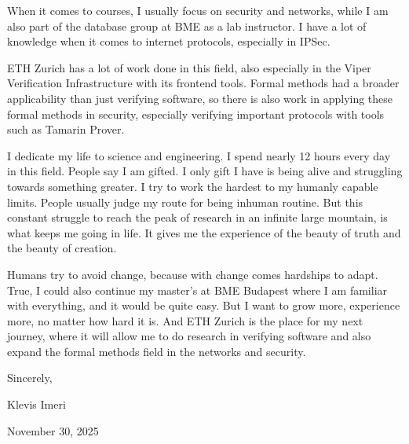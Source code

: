 \documentclass{article}
\newcommand{\LetterDate}{November 30, 2025}
\begin{document}
When it comes to courses, I usually focus on security and networks, while I am
also part of the database group at BME as a lab instructor. I have a lot of
knowledge when it comes to internet protocols, especially in IPSec.

ETH Zurich has a lot of work done in this field, also especially in the Viper
Verification Infrastructure with its frontend tools. Formal methods had a
broader applicability than just verifying software, so there is also work in
applying these formal methods in security, especially verifying important
protocols with tools such as Tamarin Prover.

I dedicate my life to science and engineering. I spend nearly 12 hours every day
in this field. People say I am gifted. I only gift I have is being alive and
struggling towards something greater. I try to work the hardest to my humanly
capable limits. People usually judge my route for being inhuman routine. But this
constant struggle to reach the peak of research in an infinite large mountain, is what keeps me
going in life. It gives me the experience of the beauty of truth and the beauty
of creation.

Humans try to avoid change, because with change comes hardships to
adapt. True, I could also continue my master's at BME Budapest where I am familiar
with everything, and it would be quite easy. But I want to grow more, experience
more, no matter how hard it is. And ETH Zurich is the place for my next journey,
where it will allow me to do research in verifying software and also
expand the formal methods field in the networks and security.

\vspace{1cm} %

\noindent
\begin{minipage}[t]{0.5\textwidth} %
    Sincerely,

    Klevis Imeri
\end{minipage}%
\hfill %
\begin{minipage}[t]{0.5\textwidth} %
    \raggedleft %
    \LetterDate
\end{minipage}
\end{document}
